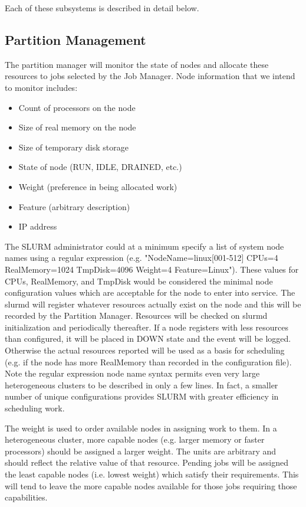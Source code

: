 Each of these subsystems is described in detail below.

\subsection{Partition Management}

The partition manager will monitor the state of nodes and allocate these
resources to jobs selected by the Job Manager.  Node information that
we intend to monitor includes:

\begin{itemize}
\item Count of processors on the node
\item Size of real memory on the node
\item Size of temporary disk storage
\item State of node (RUN, IDLE, DRAINED, etc.)
\item Weight (preference in being allocated work)
\item Feature (arbitrary description)
\item IP address
\end{itemize}

The SLURM administrator could at a minimum specify a list of system node
names using a regular expression (e.g. "NodeName=linux[001-512] CPUs=4
RealMemory=1024 TmpDisk=4096 Weight=4 Feature=Linux").  These values
for CPUs, RealMemory, and TmpDisk would be considered the minimal
node configuration values which are acceptable for the node to enter
into service.  The slurmd will register whatever resources actually
exist on the node and this will be recorded by the Partition Manager.
Resources will be checked on slurmd initialization and periodically
thereafter.  If a node registers with less resources than configured, it
will be placed in DOWN state and the event will be logged.  Otherwise the
actual resources reported will be used as a basis for scheduling (e.g. if
the node has more RealMemory than recorded in the configuration file).
Note the regular expression node name syntax permits even very large
heterogeneous clusters to be described in only a few lines.  In fact,
a smaller number of unique configurations provides SLURM with greater
efficiency in scheduling work.

The weight is used to order available nodes in assigning work to them.
In a heterogeneous cluster, more capable nodes (e.g. larger memory
or faster processors) should be assigned a larger weight.  The units
are arbitrary and should reflect the relative value of that resource.
Pending jobs will be assigned the least capable nodes (i.e. lowest
weight) which satisfy their requirements.  This will tend to leave the
more capable nodes available for those jobs requiring those capabilities.

